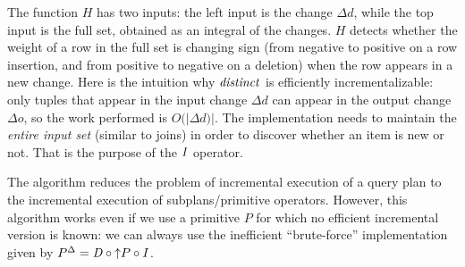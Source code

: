 The function $H$ has two inputs: the left input is the change $\Delta
d$, while the top input is the full set, obtained as an integral of
the changes.  $H$ detects whether the weight of a row in the full set
is changing sign (from negative to positive on a row insertion, and
from positive to negative on a deletion) when the row appears in a new
change.  Here is the intuition why $\mathit{distinct}$ is efficiently
incrementalizable: only tuples that appear in the input change $\Delta
d$ can appear in the output change $\Delta o$, so the work performed
is $O(|\Delta d)|$.  The implementation needs to maintain the
\emph{entire input set} (similar to joins) in order to discover
whether an item is new or not.  That is the purpose of the $\mathit{I}$
operator.

The algorithm reduces the problem of incremental execution of a query
plan to the incremental execution of sub\-plans/primitive operators.
However, this algorithm works even if we use a primitive $P$ for which
no efficient incremental version is known: we can always use the
inefficient ``brute-force'' implementation given by ${P}^{\Delta} = \mathit{D}
\circ {\uparrow}P \circ \mathit{I}$.




